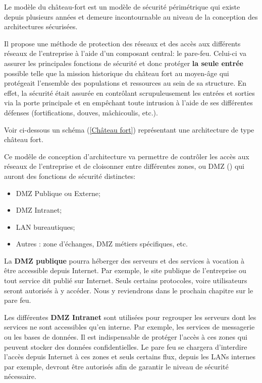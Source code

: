 Le modèle du château-fort est un modèle de sécurité périmétrique qui existe depuis plusieurs années et demeure incontournable au niveau de la conception des architectures sécurisées. 

Il propose une méthode de protection des réseaux et des accès aux différents réseaux de l'entreprise à l'aide d'un composant central: le pare-feu. Celui-ci va assurer les principales fonctions de sécurité et donc protéger \textbf{la seule entrée} possible telle que la mission historique du château fort au moyen-âge qui protégeait l'ensemble des populations et ressources au sein de sa structure. En effet, la sécurité était assurée en contrôlant scrupuleusement les entrées et sorties via la porte principale et en empêchant toute intrusion à l'aide de ses différentes défenses (fortifications, douves, mâchicoulis, etc.).

Voir ci-dessous un schéma (\ref{Château fort}) représentant une architecture de type château fort.

Ce modêle de conception d'architecture va permettre de contrôler les accès aux réseaux de l'entreprise et de cloisonner entre différentes zones, ou DMZ () qui auront des fonctions de sécurité distinctes:
\begin{itemize}
    \item DMZ Publique ou Externe;
    \item DMZ Intranet;
    \item LAN bureautiques;
    \item Autres : zone d'échanges, DMZ métiers spécifiques, etc.
\end{itemize}

La \textbf{DMZ publique} pourra héberger des serveurs et des services à vocation à être accessible depuis Internet. Par exemple, le site publique de l'entreprise ou tout service dit publié sur Internet. Seuls certains protocoles, voire utilisateurs seront autorisés à y accéder. Nous y reviendrons dans le prochain chapitre sur le pare feu.

Les différentes \textbf{DMZ Intranet} sont utilisées pour regrouper les serveurs dont les services ne sont accessibles qu'en interne. Par exemple, les services de messagerie ou les bases de données. Il est indispensable de protéger l'accès à ces zones qui peuvent stocker des données confidentielles. Le pare feu se chargera d'interdire l'accès depuis Internet à ces zones et seuls certains flux, depuis les LANs internes par exemple, devront être autorisés afin de garantir le niveau de sécurité nécessaire.

